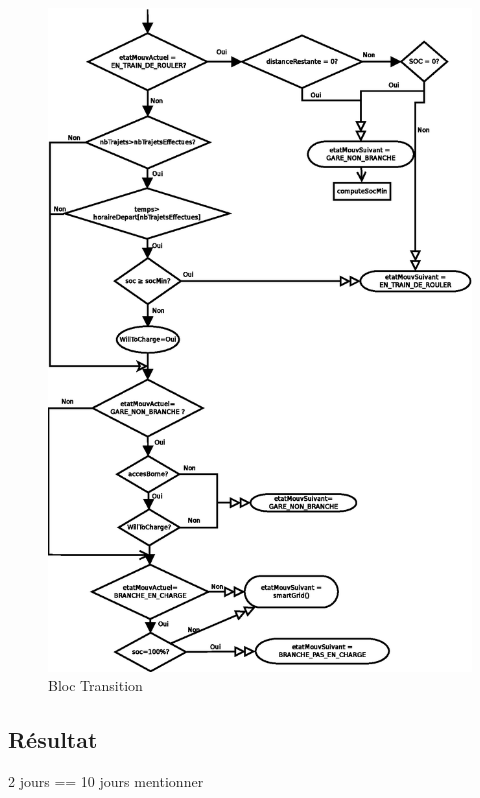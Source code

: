 \documentclass[10pt]{article}
\begin{document}
			\begin{figure}[h]
				\centering
				\caption{Bloc Transition \label{fig.flowTransition}}
				\includegraphics[height=0.9\textheight]{fig/flowTransition.eps}
			\end{figure}
		
		
		\clearpage
	\subsection{Résultat}

2 jours == 10 jours mentionner
 
\end{document}
